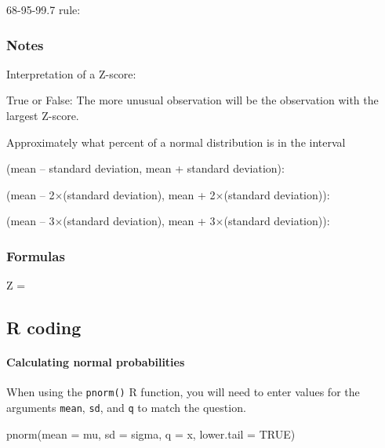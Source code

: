 \documentclass[
]{report}
\newenvironment{Shaded}{\begin{snugshade}}{\end{snugshade}}
\newcommand{\AttributeTok}[1]{\textcolor[rgb]{0.77,0.63,0.00}{#1}}
\newcommand{\ConstantTok}[1]{\textcolor[rgb]{0.00,0.00,0.00}{#1}}
\newcommand{\FunctionTok}[1]{\textcolor[rgb]{0.00,0.00,0.00}{#1}}
\newcommand{\NormalTok}[1]{#1}
\newcommand{\rgs}{\vspace{12pt}} %
\newcommand{\rgi}{\hspace{24pt}}  %
\begin{document}
68-95-99.7 rule:
\rgs

\hypertarget{notes-15}{%
\subsubsection*{Notes}\label{notes-15}}

Interpretation of a Z-score:
\rgs

True or False: The more unusual observation will be the observation with the largest Z-score.

Approximately what percent of a normal distribution is in the interval

\rgi (mean -- standard deviation, mean + standard deviation):
\rgs

\rgi (mean -- 2\(\times\)(standard deviation), mean + 2\(\times\)(standard deviation)):
\rgs

\rgi (mean -- 3\(\times\)(standard deviation), mean + 3\(\times\)(standard deviation)):
\rgs

\hypertarget{formulas-1}{%
\subsubsection*{Formulas}\label{formulas-1}}

Z =
\rgs

\hypertarget{r-coding}{%
\subsection*{R coding}\label{r-coding}}

\hypertarget{calculating-normal-probabilities}{%
\paragraph*{Calculating normal probabilities}\label{calculating-normal-probabilities}}

When using the \texttt{pnorm()} R function, you will need to enter values for the arguments \texttt{mean}, \texttt{sd}, and \texttt{q} to match the question.

\begin{Shaded}
\begin{Highlighting}[]
\FunctionTok{pnorm}\NormalTok{(}\AttributeTok{mean =}\NormalTok{ mu, }\AttributeTok{sd =}\NormalTok{ sigma, }\AttributeTok{q =}\NormalTok{ x, }\AttributeTok{lower.tail =} \ConstantTok{TRUE}\NormalTok{)}
\end{Highlighting}
\end{Shaded}
\end{document}
